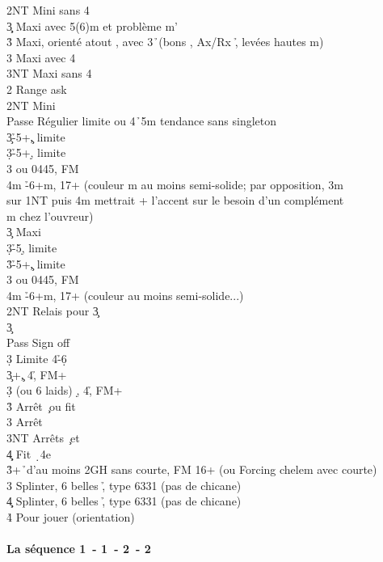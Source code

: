 \documentclass[a4paper]{article}
\begin{document}
\begin{bidtable}
2NT \> Mini sans 4\s \\
3\c\d \> Maxi avec 5(6)m et problème m'\\
3\h \> Maxi, orienté atout \s , avec 3\h\ (bons \s , Ax/Rx \h , levées hautes m)\\
3\s \> Maxi avec 4\s \\
3NT \> Maxi sans 4\s \-\\
2\s \> Range ask\+\\
2NT \> Mini\+\\
Passe \> Régulier limite ou 4\h\ 5m tendance sans singleton\\
3\c {}\h -5+\c , limite\\
3\d {}\h -5+\d , limite\\
3\s {} ou 0445, FM\\
4m \h -6+m, 17+ (couleur m au moins semi-solide; par opposition, 3m\\
\>sur 1NT puis 4m mettrait + l'accent sur le besoin d'un complément\\
\>m chez l'ouvreur)\-\\
3\c \> Maxi\+\\
3\d {}\h -5\d , limite\\
3\h {}\h -5+\c , limite\\
3\s {} ou 0445, FM\\
4m \h -6+m, 17+ (couleur au moins semi-solide...)\-\-\\
2NT \> Relais pour 3\c \+\\
3\c\+\\
Pass \> Sign off \c \\
3\d \> Limite 4\h -6\d \-\-\\
3\c {}+\c , 4\h , FM+\\
3\d {} (ou 6 laids) \d , 4\h , FM+\+\\
3\h \> Arrêt \c\ ou fit \h \\
3\s \> Arrêt \s \\
3NT \> Arrêts \c\ et \s \\
4\c\d \> Fit \d\ 4e\-\\
3\h {}+\h\ d'au moins 2GH sans courte, FM 16+ (ou Forcing chelem avec courte)\\
3\s \> Splinter, 6 belles \h , type 6331 (pas de chicane)\\
4\c\d \> Splinter, 6 belles \h , type 6331 (pas de chicane)\\
4\h \> Pour jouer (orientation)\-
\end{bidtable}

\paragraph{La séquence 1\pdfc\ - 1\pdfd\ - 2\pdfc\ - 2\pdfd}
\end{document}

